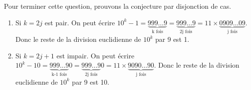 \documentclass[a4paper,12pt, french, noSujetB]{article}
\begin{document}
\begin{enumerate}
	Pour terminer cette question, prouvons la conjecture par disjonction de cas.
	\begin{enumerate}[label=(\roman*)]
		\item Si $k=2j$ est pair. On peut écrire $10^k-1 =\underbrace{999\dots 9}_{\text{k fois}}=\underbrace{999\dots 9}_{\text{2j fois}} = 11\times \underbrace{0909\dots 09}_{\text{j fois}} $. Donc le reste de la division euclidienne de $10^k$ par 9 est 1.
		\item Si $k=2j+1$ est impair. On peut écrire $10^k-10=\underbrace{999\dots 9}_{\text{k-1 fois}}0=\underbrace{999\dots 9}_{\text{2j fois}}0 = 11\times \underbrace{9090\dots 90}_{\text{j fois}}$. Donc le reste de la division euclidienne de $10^k$ par 9 est 10.
	\end{enumerate}
\end{enumerate}
\end{document}
